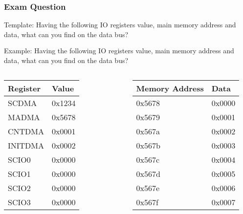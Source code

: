\begin{frame}
    \frametitle{Exam Question}
    Template: Having the following IO registers value, main memory address and data, what can you find on the data bus?

    Example: Having the following IO registers value, main memory address and data, what can you find on the data bus?
    \begin{columns}
    \begin{table}[]
        \begin{tabular}{|l|l|}
            \hline
            \textbf{Register} & \textbf{Value} \\ \hline
            SCDMA & 0x1234 \\ \hline
            MADMA & 0x5678 \\ \hline
            CNTDMA & 0x0001 \\ \hline
            INITDMA & 0x0002 \\ \hline
            SCIO0 & 0x0000 \\ \hline
            SCIO1 & 0x0000 \\ \hline
            SCIO2 & 0x0000 \\ \hline
            SCIO3 & 0x0000 \\ \hline
        \end{tabular}
    \end{table}
    \begin{table}[]
        \begin{tabular}{|l|l|}
            \hline
            \textbf{Memory Address} & \textbf{Data} \\ \hline
            0x5678 & 0x0000 \\ \hline
            0x5679 & 0x0001 \\ \hline
            0x567a & 0x0002 \\ \hline
            0x567b & 0x0003 \\ \hline
            0x567c & 0x0004 \\ \hline
            0x567d & 0x0005 \\ \hline
            0x567e & 0x0006 \\ \hline
            0x567f & 0x0007 \\ \hline
        \end{tabular}
    \end{table}
    \end{columns}

\end{frame}
